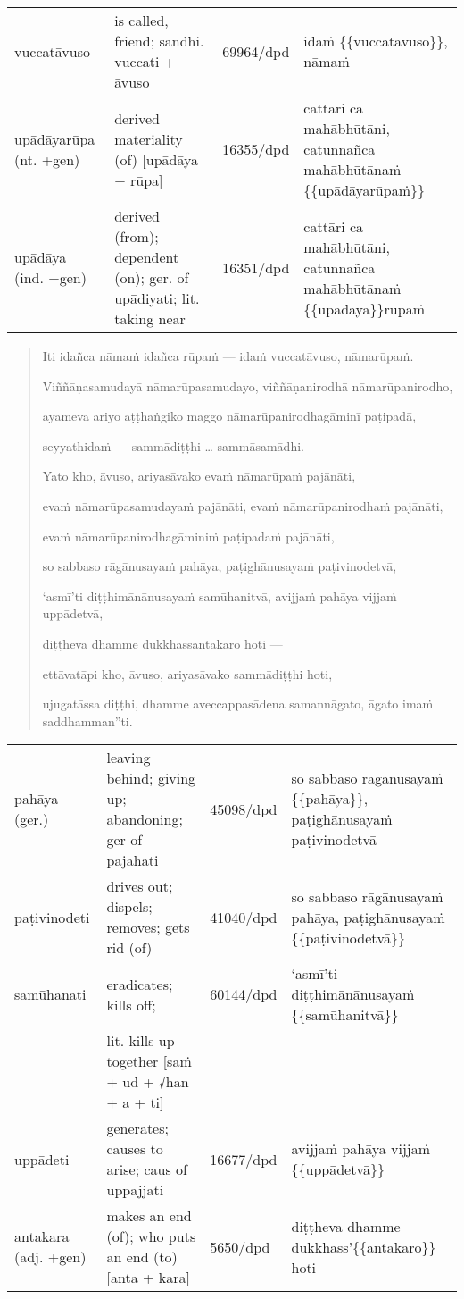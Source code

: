 \documentclass[11pt,oneside]{memoir}
\begin{document}
\begin{longtable}{L{\colOne} L{\colTwo} H H}
vuccatāvuso & is called, friend; sandhi. vuccati + āvuso & 69964/dpd & idaṁ \{\{vuccatāvuso\}\}, nāmaṁ\\[0pt]
upādāyarūpa (nt. +gen) & derived materiality (of) [upādāya + rūpa] & 16355/dpd & cattāri ca mahābhūtāni, catunnañca mahābhūtānaṁ \{\{upādāyarūpaṁ\}\}\\[0pt]
upādāya (ind. +gen) & derived (from); dependent (on); ger. of upādiyati; lit. taking near & 16351/dpd & cattāri ca mahābhūtāni, catunnañca mahābhūtānaṁ \{\{upādāya\}\}rūpaṁ\\[0pt]
\end{longtable}


\begin{quote}
Iti idañca nāmaṁ idañca rūpaṁ — idaṁ vuccatāvuso, nāmarūpaṁ.

Viññāṇasamudayā nāmarūpasamudayo, viññāṇanirodhā nāmarūpanirodho,

ayameva ariyo aṭṭhaṅgiko maggo nāmarūpanirodhagāminī paṭipadā,

seyyathidaṁ — sammādiṭṭhi \ldots{} sammāsamādhi.

Yato kho, āvuso, ariyasāvako evaṁ nāmarūpaṁ pajānāti,

evaṁ nāmarūpasamudayaṁ pajānāti, evaṁ nāmarūpanirodhaṁ pajānāti,

evaṁ nāmarūpanirodhagāminiṁ paṭipadaṁ pajānāti,

so sabbaso rāgānusayaṁ pahāya, paṭighānusayaṁ paṭivinodetvā,

‘asmī’ti diṭṭhimānānusayaṁ samūhanitvā, avijjaṁ pahāya vijjaṁ uppādetvā,

diṭṭheva dhamme dukkhassantakaro hoti —

ettāvatāpi kho, āvuso, ariyasāvako sammādiṭṭhi hoti,

ujugatāssa diṭṭhi, dhamme aveccappasādena samannāgato, āgato imaṁ saddhamman”ti.
\end{quote}

\begin{longtable}{L{\colOne} L{\colTwo} H H}
pahāya (ger.) & leaving behind; giving up; abandoning; ger of pajahati & 45098/dpd & so sabbaso rāgānusayaṁ \{\{pahāya\}\}, paṭighānusayaṁ paṭivinodetvā\\[0pt]
paṭivinodeti & drives out; dispels; removes; gets rid (of) & 41040/dpd & so sabbaso rāgānusayaṁ pahāya, paṭighānusayaṁ \{\{paṭivinodetvā\}\}\\[0pt]
samūhanati & eradicates; kills off; & 60144/dpd & ‘asmī’ti diṭṭhimānānusayaṁ \{\{samūhanitvā\}\}\\[0pt]
 & lit. kills up together [saṁ + ud + √han + a + ti] &  & \\[0pt]
uppādeti & generates; causes to arise; caus of uppajjati & 16677/dpd & avijjaṁ pahāya vijjaṁ \{\{uppādetvā\}\}\\[0pt]
antakara (adj. +gen) & makes an end (of); who puts an end (to) [anta + kara] & 5650/dpd & diṭṭheva dhamme dukkhass'\{\{antakaro\}\} hoti\\[0pt]
\end{longtable}
\end{document}
